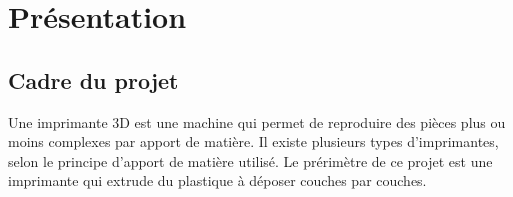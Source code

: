 \section{Présentation}
\subsection{Cadre du projet}
Une imprimante 3D est une machine qui permet de reproduire des pièces %
plus ou moins complexes par apport de matière. Il existe plusieurs types %
d'imprimantes, selon le principe d'apport de matière utilisé. Le prérimètre %
de ce projet est une imprimante qui extrude du plastique à déposer couches %
par couches.
